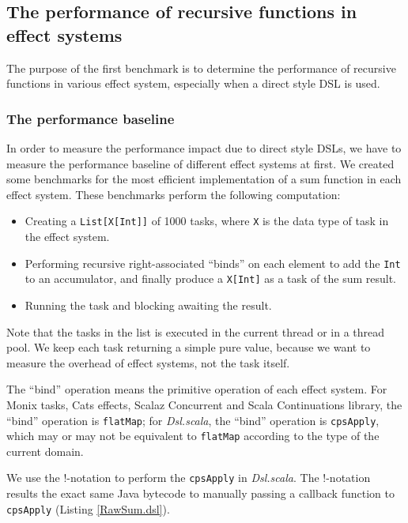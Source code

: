 \subsection{The performance of recursive functions in effect systems}

The purpose of the first benchmark is to determine the performance of recursive functions in various effect system, especially when a direct style DSL is used.

\subsubsection{The performance baseline}

In order to measure the performance impact due to direct style DSLs, we have to measure the performance baseline of different effect systems at first. We created some benchmarks for the most efficient implementation of a sum function in each effect system. These benchmarks perform the following computation:

\begin{itemize}
  \item Creating a \lstinline{List[X[Int]]} of 1000 tasks, where \lstinline{X} is the data type of task in the effect system.
  \item Performing recursive right-associated ``binds'' on each element to add the \lstinline{Int} to an accumulator, and finally produce a \lstinline{X[Int]} as a task of the sum result.
  \item Running the task and blocking awaiting the result.
\end{itemize}

Note that the tasks in the list is executed in the current thread or in a thread pool. We keep each task returning a simple pure value, because we want to measure the overhead of effect systems, not the task itself.

The ``bind'' operation means the primitive operation of each effect system. For Monix tasks, Cats effects, Scalaz Concurrent and Scala Continuations library, the ``bind'' operation is \lstinline{flatMap}; for \textit{Dsl.scala}, the ``bind'' operation is \lstinline{cpsApply}, which may or may not be equivalent to \lstinline{flatMap} according to the type of the current domain.

We use the !-notation to perform the \lstinline{cpsApply} in \textit{Dsl.scala}. The !-notation results the exact same Java bytecode to manually passing a callback function to \lstinline{cpsApply} (Listing \ref{RawSum.dsl}).

